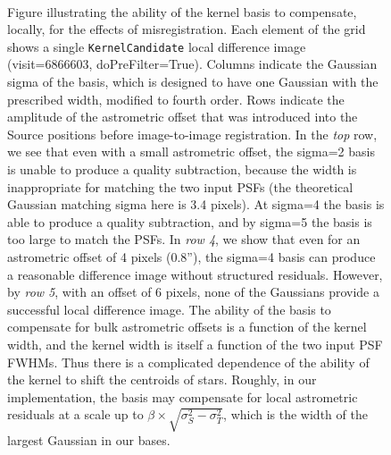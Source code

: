 \documentclass[prd, nofootinbib, floatfix, 11pt,tightenlines,times]{article}
\begin{document}
{\begin{figure}
 \\
\caption{Figure illustrating the ability of the kernel basis to
  compensate, locally, for the effects of misregistration.  Each
  element of the grid shows a single {\tt KernelCandidate} local
  difference image (visit=6866603, doPreFilter=True).  Columns
  indicate the Gaussian sigma of the basis, which is designed to have
  one Gaussian with the prescribed width, modified to fourth order.
  Rows indicate the amplitude of the astrometric offset that was
  introduced into the Source positions before image-to-image
  registration.  In the {\it top} row, we see that even with a small
  astrometric offset, the sigma=2 basis is unable to produce a quality
  subtraction, because the width is inappropriate for matching the two
  input PSFs (the theoretical Gaussian matching sigma here is 3.4 pixels).  At
  sigma=4 the basis is able to produce a quality subtraction, and by
  sigma=5 the basis is too large to match the PSFs.  In {\it row 4},
  we show that even for an astrometric offset of 4 pixels (0.8''), the
  sigma=4 basis can produce a reasonable difference image without
  structured residuals.  However, by {\it row 5}, with an offset of 6
  pixels, none of the Gaussians provide a successful local difference
  image.  The ability of the basis to compensate for bulk astrometric
  offsets is a function of the kernel width, and the kernel width is
  itself a function of the two input PSF FWHMs.  Thus there is a
  complicated dependence of the ability of the kernel to shift the
  centroids of stars.  Roughly, in our implementation, the basis may
  compensate for local astrometric residuals at a scale up to $\beta
  \times \sqrt{\sigma_S^2 - \sigma_T^2}$, which is the width of the
  largest Gaussian in our bases.}
\label{kernel_offsets}
\end{figure}


}
\end{document}
